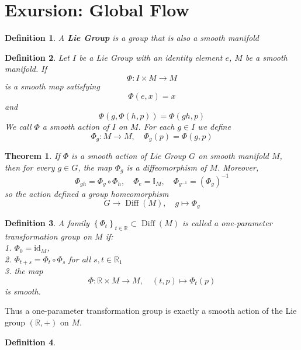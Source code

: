 \documentclass[a4paper, 12pt]{book}
\newtheorem{definition}{Definition}[chapter]
\newtheorem{theorem}{Theorem}[chapter]
\begin{document}
\section{Exursion: Global Flow}
\begin{definition}
    A \textbf{Lie Group} is a group that is also a smooth manifold
\end{definition}
\begin{definition}
 Let \( I \) be a Lie Group with an identity element \( e \), \( M \) be a smooth manifold. If \[
  \Phi: I\times M\to M
 \]
 is a smooth map satisfying \[
  \Phi(e,x)=x
 \]
 and
 \[
  \Phi(g,\Phi(h,p))=\Phi(gh,p)
 \]
 We call \( \Phi \) a smooth action of \( I \) on \( M \). For each \( g\in I \) we define \[
  \Phi_g:M \to M, \quad \Phi_g(p)=\Phi(g,p)
 \]
\end{definition}
\begin{theorem}
 If \( \Phi  \) is a smooth action of Lie Group \( G \) on smooth manifold \( M \), then for every \( g\in G \), the map \( \Phi_g \) is a diffeomorphism of \( M \). Moreover, \[
  \Phi_{gh} = \Phi_g \circ \Phi_h, \quad \Phi_e=\mathbb{I}_M, \quad \Phi_{g^{-1} } =(\Phi_g)^{-1} 
 \]
 so the action defined a group homeomorphism \[
  G \to \operatorname{Diff}(M), \quad g\mapsto \Phi_g 
 \]
\end{theorem}
\begin{definition}
 A family $\left\{\Phi_t\right\}_{t \in \mathbb{R}} \subset \operatorname{Diff}(M)$ is called a one-parameter transformation group on $M$ if:\\
1. $\Phi_0=\mathrm{id}_M$,\\
2. $\Phi_{t+s}=\Phi_t \circ \Phi_s$ for all $s, t \in \mathbb{R}_1$\\
3. the map
$$
\Phi: \mathbb{R} \times M \rightarrow M, \quad(t, p) \mapsto \Phi_t(p)
$$
is smooth.\\
\end{definition}


Thus a one-parameter transformation group is exactly a smooth action of the Lie group $(\mathbb{R},+)$ on $M$. 
\begin{definition}
 
\end{definition}
\end{document}
